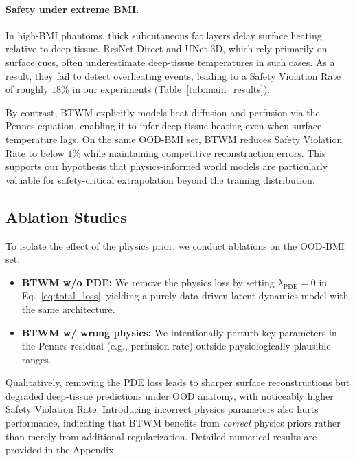 \documentclass{article}
\begin{document}
\paragraph{Safety under extreme BMI.}
In high-BMI phantoms, thick subcutaneous fat layers delay surface heating relative to deep tissue. ResNet-Direct and UNet-3D, which rely primarily on surface cues, often underestimate deep-tissue temperatures in such cases. As a result, they fail to detect overheating events, leading to a Safety Violation Rate of roughly $18\%$ in our experiments (Table~\ref{tab:main_results}).

By contrast, BTWM explicitly models heat diffusion and perfusion via the Pennes equation, enabling it to infer deep-tissue heating even when surface temperature lags. On the same OOD-BMI set, BTWM reduces Safety Violation Rate to below $1\%$ while maintaining competitive reconstruction errors. This supports our hypothesis that physics-informed world models are particularly valuable for safety-critical extrapolation beyond the training distribution.

\subsection{Ablation Studies}
\label{sec:ablation}

To isolate the effect of the physics prior, we conduct ablations on the OOD-BMI set:

\begin{itemize}
    \item \textbf{BTWM w/o PDE:} We remove the physics loss by setting $\lambda_{\mathrm{PDE}} = 0$ in Eq.~\eqref{eq:total_loss}, yielding a purely data-driven latent dynamics model with the same architecture.
    \item \textbf{BTWM w/ wrong physics:} We intentionally perturb key parameters in the Pennes residual (e.g., perfusion rate) outside physiologically plausible ranges.
\end{itemize}

Qualitatively, removing the PDE loss leads to sharper surface reconstructions but degraded deep-tissue predictions under OOD anatomy, with noticeably higher Safety Violation Rate. Introducing incorrect physics parameters also hurts performance, indicating that BTWM benefits from \emph{correct} physics priors rather than merely from additional regularization. Detailed numerical results are provided in the Appendix.

\end{document}
